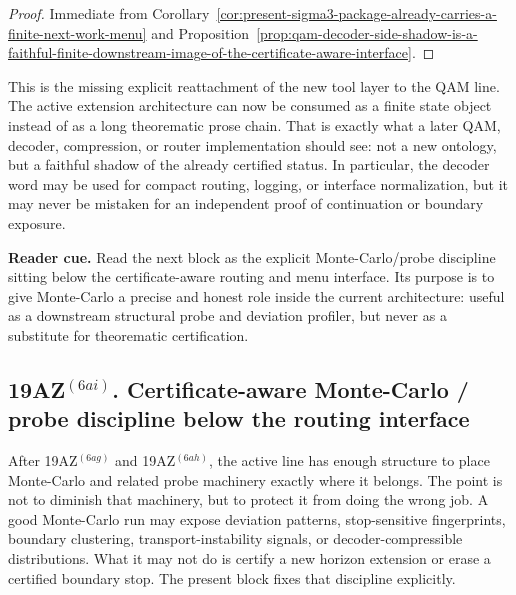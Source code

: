 \begin{proof}
Immediate from Corollary~\ref{cor:present-sigma3-package-already-carries-a-finite-next-work-menu} and Proposition~\ref{prop:qam-decoder-side-shadow-is-a-faithful-finite-downstream-image-of-the-certificate-aware-interface}.
\end{proof}

\begin{remark}
\label{rem:what-this-qam-decoder-side-shadow-now-buys}
This is the missing explicit reattachment of the new tool layer to the QAM line. The active extension architecture can now be consumed as a finite state object instead of as a long theorematic prose chain. That is exactly what a later QAM, decoder, compression, or router implementation should see: not a new ontology, but a faithful shadow of the already certified status. In particular, the decoder word may be used for compact routing, logging, or interface normalization, but it may never be mistaken for an independent proof of continuation or boundary exposure.
\end{remark}

\noindent\textbf{Reader cue.} Read the next block as the explicit Monte-Carlo/probe discipline sitting below the certificate-aware routing and menu interface. Its purpose is to give Monte-Carlo a precise and honest role inside the current architecture: useful as a downstream structural probe and deviation profiler, but never as a substitute for theorematic certification.

\subsection*{19AZ$^{(6ai)}$. Certificate-aware Monte-Carlo / probe discipline below the routing interface}
\label{sec:certificate-aware-monte-carlo-probe-discipline-below-the-routing-interface}
After 19AZ$^{(6ag)}$ and 19AZ$^{(6ah)}$, the active line has enough structure to place Monte-Carlo and related probe machinery exactly where it belongs. The point is not to diminish that machinery, but to protect it from doing the wrong job. A good Monte-Carlo run may expose deviation patterns, stop-sensitive fingerprints, boundary clustering, transport-instability signals, or decoder-compressible distributions. What it may not do is certify a new horizon extension or erase a certified boundary stop. The present block fixes that discipline explicitly.

